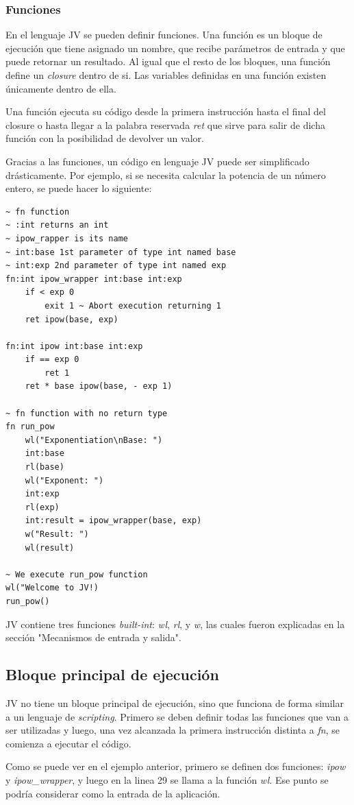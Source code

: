 \documentclass[spanish]{article}
\begin{document}
            \subsubsection{Funciones}
                \par En el lenguaje JV se pueden definir funciones. Una función es un bloque de ejecución que tiene asignado un nombre, que recibe parámetros de entrada y que puede retornar un resultado. Al igual que el resto de los bloques, una función define un \textit{closure} dentro de si. Las variables definidas en una función existen únicamente dentro de ella.
                \par Una función ejecuta su código desde la primera instrucción hasta el final del closure o hasta llegar a la palabra reservada \textit{ret} que sirve para salir de dicha función con la posibilidad de devolver un valor.
                \par Gracias a las funciones, un código en lenguaje JV puede ser simplificado drásticamente. Por ejemplo, si se necesita calcular la potencia de un número entero, se puede hacer lo siguiente:
                \begin{lstlisting}
~ fn function
~ :int returns an int
~ ipow_rapper is its name
~ int:base 1st parameter of type int named base
~ int:exp 2nd parameter of type int named exp
fn:int ipow_wrapper int:base int:exp
	if < exp 0
		exit 1 ~ Abort execution returning 1
	ret ipow(base, exp)

fn:int ipow int:base int:exp
	if == exp 0
		ret 1
	ret * base ipow(base, - exp 1)

~ fn function with no return type
fn run_pow
    wl("Exponentiation\nBase: ")
    int:base
    rl(base)
    wl("Exponent: ")
    int:exp
    rl(exp)
    int:result = ipow_wrapper(base, exp)
    w("Result: ")
    wl(result)

~ We execute run_pow function
wl("Welcome to JV!)
run_pow()
                \end{lstlisting}

                \par JV contiene tres funciones \textit{built-int}: \textit{wl}, \textit{rl}, y \textit{w}, las cuales fueron explicadas en la sección "Mecanismos de entrada y salida".

            \subsection{Bloque principal de ejecución}
                \par JV no tiene un bloque principal de ejecución, sino que funciona de forma similar a un lenguaje de \textit{scripting}. Primero se deben definir todas las funciones que van a ser utilizadas y luego, una vez alcanzada la primera instrucción distinta a \textit{fn}, se comienza a ejecutar el código.
                \par Como se puede ver en el ejemplo anterior, primero se definen dos funciones: \textit{ipow} y \textit{ipow\_wrapper}, y luego en la linea 29 se llama a la función \textit{wl}. Ese punto se podría considerar como la entrada de la aplicación. 
\end{document}
